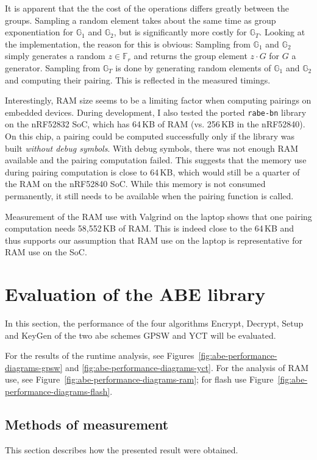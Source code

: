 It is apparent that the the cost of the operations differs greatly between the groups. 
Sampling a random element takes about the same time as group exponentiation for $\mathbb{G}_1$ and $\mathbb{G}_2$, but is significantly more costly for $\mathbb{G}_T$.
Looking at the implementation, the reason for this is obvious: Sampling from $\mathbb{G}_1$ and $\mathbb{G}_2$ simply generates a random $z \in \mathbb{F}_r$ and returns the group element $z \cdot G$ for $G$ a generator.
Sampling from $\mathbb{G}_T$ is done by generating random elements of $\mathbb{G}_1$ and $\mathbb{G}_2$ and computing their pairing.
This is reflected in the measured timings.

Interestingly, RAM size seems to be a limiting factor when computing pairings on embedded devices.
During development, I also tested the ported \texttt{rabe-bn} library on the nRF52832 SoC, which has 64\,KB of RAM (vs. 256\,KB in the nRF52840). 
On this chip, a pairing could be computed successfully only if the library was built \emph{without debug symbols}.
With debug symbols, there was not enough RAM available and the pairing computation failed.
This suggests that the memory use during pairing computation is close to 64\,KB, which would still be a quarter of the RAM on the nRF52840 SoC.
While this memory is not consumed permanently, it still needs to be available when the pairing function is called.

Measurement of the RAM use with Valgrind on the laptop shows that one pairing computation needs 58,552\,KB of RAM.
This is indeed close to the 64\,KB and thus supports our assumption that RAM use on the laptop is representative for RAM use on the SoC.

\section{Evaluation of the ABE library}\label{sec:abe-performance}

In this section, the performance of the four algorithms Encrypt, Decrypt, Setup and KeyGen of the two \acrshort{abe} schemes GPSW and YCT will be evaluated.

For the results of the runtime analysis, see Figures~\ref{fig:abe-performance-diagrams-gpsw} and \ref{fig:abe-performance-diagrams-yct}. 
For the analysis of RAM use, see Figure~\ref{fig:abe-performance-diagrams-ram}; for flash use Figure~\ref{fig:abe-performance-diagrams-flash}. 


\subsection{Methods of measurement}
This section describes how the presented result were obtained.


